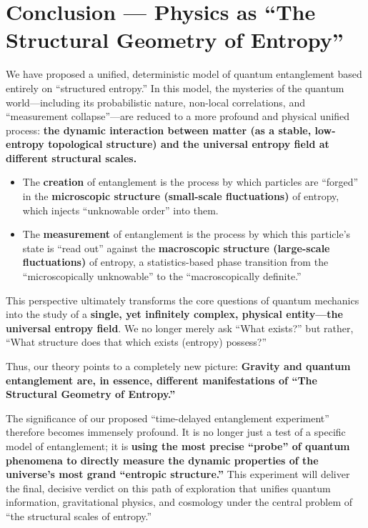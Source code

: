 \documentclass[11pt]{article}
\begin{document}
\section{Conclusion — Physics as ``The Structural Geometry of Entropy''}

We have proposed a unified, deterministic model of quantum entanglement based entirely on ``structured entropy.'' In this model, the mysteries of the quantum world—including its probabilistic nature, non-local correlations, and ``measurement collapse''—are reduced to a more profound and physical unified process: \textbf{the dynamic interaction between matter (as a stable, low-entropy topological structure) and the universal entropy field at different structural scales.}

\begin{itemize}
    \item   The \textbf{creation} of entanglement is the process by which particles are ``forged'' in the \textbf{microscopic structure (small-scale fluctuations)} of entropy, which injects ``unknowable order'' into them.
    \item   The \textbf{measurement} of entanglement is the process by which this particle's state is ``read out'' against the \textbf{macroscopic structure (large-scale fluctuations)} of entropy, a statistics-based phase transition from the ``microscopically unknowable'' to the ``macroscopically definite.''
\end{itemize}

\noindent This perspective ultimately transforms the core questions of quantum mechanics into the study of a \textbf{single, yet infinitely complex, physical entity—the universal entropy field}. We no longer merely ask ``What exists?'' but rather, ``What structure does that which exists (entropy) possess?''

\noindent Thus, our theory points to a completely new picture: \textbf{Gravity and quantum entanglement are, in essence, different manifestations of ``The Structural Geometry of Entropy.''}

\noindent The significance of our proposed ``time-delayed entanglement experiment'' therefore becomes immensely profound. It is no longer just a test of a specific model of entanglement; it is \textbf{using the most precise ``probe'' of quantum phenomena to directly measure the dynamic properties of the universe's most grand ``entropic structure.''} This experiment will deliver the final, decisive verdict on this path of exploration that unifies quantum information, gravitational physics, and cosmology under the central problem of ``the structural scales of entropy.''
\end{document}

